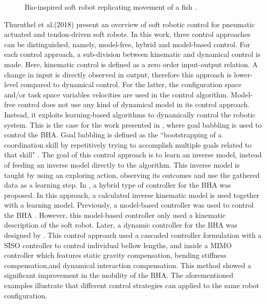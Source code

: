\begin{minipage}{\linewidth}
\begin{minipage}{0.45\linewidth}
\begin{figure}[H]
              \caption{Bio-inspired soft robot replicating movement of a fish \cite{marchese2014autonomous}.}
          \end{figure}
      \end{minipage}
  \end{minipage}

Thuruthel et al.(2018) \cite{george2018control} present an overview of soft robotic control for pneumatic actuated and tendon-driven soft robots. In this work, three control approaches can be distinguished, namely, model-free, hybrid and model-based control. For each control approach, a sub-division between kinematic and dynamical control is made. Here, kinematic control is defined as a zero order input-output relation. A change in input is directly observed in output, therefore this approach is lower-level compared to dynamical control. For the latter, the configuration space and/or task space variables velocities are used in the control algorithm. Model-free control does not use any kind of dynamical model in its control approach. Instead, it exploits learning-based algorithms to dynamically control the robotic system. This is the case for the work presented in \cite{rolf2013efficient}, where goal babbling is used to control the BHA. Goal babbling is defined as the ``bootstrapping of a coordination skill by repetitively trying to accomplish multiple goals related to that skill" \cite{rolf2012goal}. The goal of this control approach is to learn an inverse model, instead of feeding an inverse model directly to the algorithm. This inverse model is taught by using an exploring action, observing its outcomes and use the gathered data as a learning step. In \cite{reinhart2017hybrid}, a hybrid type of controller for the BHA was proposed. In this approach, a calculated inverse kinematic model is used together with a learning model. Previously, a model-based controller was used to control the BHA \cite{mahl2014bhakin}. However, this model-based controller only used a kinematic description of the soft robot. Later, a dynamic controller for the BHA was designed by \cite{falkenhahn2016dynamic}. This control approach used a cascaded controller formulation with a SISO controller to control individual bellow lengths, and inside a MIMO controller which features static gravity compensation, bending stiffness compensation,and dynamical interaction compensation. This method showed a significant improvement in the mobility of the BHA. The aforementioned examples illustrate that different control strategies can applied to the same robot configuration. 













